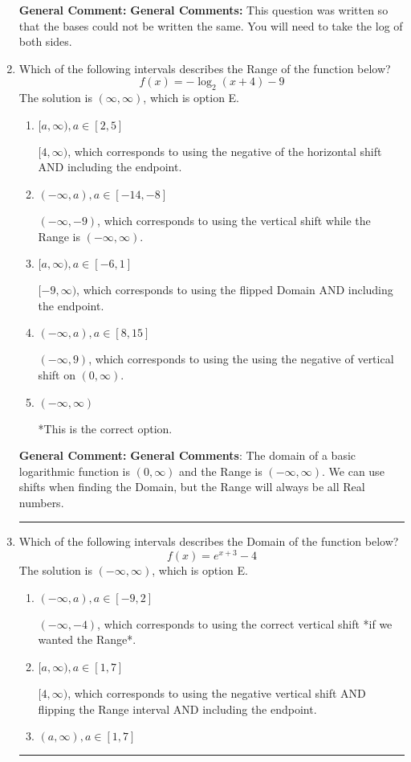 \documentclass{extbook}[14pt]
\newcommand{\litem}[1]{\item #1

\rule{\textwidth}{0.4pt}}
\begin{document}
\begin{enumerate}
{\textbf{General Comment:} \textbf{General Comments:} This question was written so that the bases could not be written the same. You will need to take the log of both sides.
}
\litem{
Which of the following intervals describes the Range of the function below?
\[ f(x) = -\log_2{(x+4)}-9 \]The solution is \( (\infty, \infty) \), which is option E.\begin{enumerate}[label=\Alph*.]
\item \( [a, \infty), a \in [2, 5] \)

$[4, \infty)$, which corresponds to using the negative of the horizontal shift AND including the endpoint.
\item \( (-\infty, a), a \in [-14, -8] \)

$(-\infty, -9)$, which corresponds to using the vertical shift while the Range is $(-\infty, \infty)$.
\item \( [a, \infty), a \in [-6, 1] \)

$[-9, \infty)$, which corresponds to using the flipped Domain AND including the endpoint.
\item \( (-\infty, a), a \in [8, 15] \)

$(-\infty, 9)$, which corresponds to using the using the negative of vertical shift on $(0, \infty)$.
\item \( (-\infty, \infty) \)

*This is the correct option.
\end{enumerate}

\textbf{General Comment:} \textbf{General Comments}: The domain of a basic logarithmic function is $(0, \infty)$ and the Range is $(-\infty, \infty)$. We can use shifts when finding the Domain, but the Range will always be all Real numbers.
}
\litem{
Which of the following intervals describes the Domain of the function below?
\[ f(x) = e^{x+3}-4 \]The solution is \( (-\infty, \infty) \), which is option E.\begin{enumerate}[label=\Alph*.]
\item \( (-\infty, a), a \in [-9, 2] \)

$(-\infty, -4)$, which corresponds to using the correct vertical shift *if we wanted the Range*.
\item \( [a, \infty), a \in [1, 7] \)

$[4, \infty)$, which corresponds to using the negative vertical shift AND flipping the Range interval AND including the endpoint.
\item \( (a, \infty), a \in [1, 7] \)


\end{enumerate}}
\end{enumerate}
\end{document}
